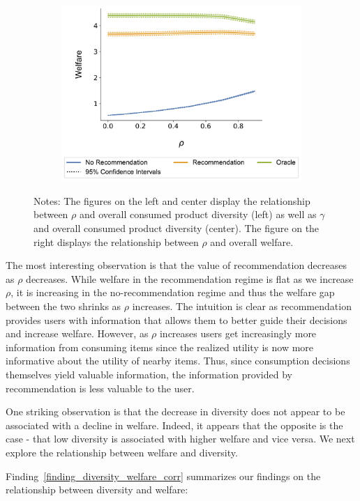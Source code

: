 \documentclass[manuscript]{acmart}
\begin{document}
\begin{figure}[t]
\begin{subfigure}{0.3\linewidth}
  \includegraphics[width=1.0\linewidth]{figures/rho_welfare_N_200_T_20.pdf}
\end{subfigure}
\caption*{\scriptsize Notes: The figures on the left and center display the relationship between $\rho$ and overall consumed product diversity (left) as well as $\gamma$ and overall consumed product diversity (center). The figure on the right displays the relationship between $\rho$ and overall welfare.}
\end{figure}
\addtocounter{figure}{-1}


The most interesting observation is that the value of recommendation decreases as $\rho$ decreases. While welfare in the recommendation regime is flat as we increase $\rho$, it is increasing in the no-recommendation regime and thus the welfare gap between the two shrinks as $\rho$ increases. The intuition is clear as recommendation provides users with information that allows them to better guide their decisions and increase welfare. However, as $\rho$ increases users get increasingly more information from consuming items since the realized utility is now more informative about the utility of nearby items. Thus, since consumption decisions themselves yield valuable information, the information provided by recommendation is less valuable to the user.
\par 
One striking observation is that the decrease in diversity does not appear to be associated with a decline in welfare. Indeed, it appears that the opposite is the case - that low diversity is associated with higher welfare and vice versa. We next explore the relationship between welfare and diversity.
\par
\noindent Finding~\ref{finding_diversity_welfare_corr} summarizes our findings on the relationship between diversity and welfare:
\end{document}
